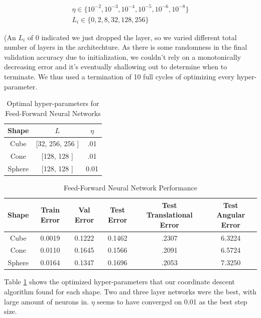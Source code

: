 \documentclass[journal]{IEEEtran}
\begin{document}
\begin{gather}
\eta \in \{  10^{-2}, 10^{-3}, 10^{-4}, 10^{-5}, 10^{-6}, 10^{-8} \}\\
L_i \in \{  0, 2, 8, 32, 128, 256  \}
\end{gather}

\noindent (An $L_i$ of 0 indicated we just dropped the layer, so we varied different total number of layers in the architechture. As there is some randomness in the final validation accuracy due to initialization, we couldn't rely on a monotonically decreasing error and it's eventually shallowing out to determine when to terminate. We thus used a termination of 10 full cycles of optimizing every hyper-parameter.

\begin{table}
\caption{Optimal hyper-parameters for Feed-Forward Neural Networks}
\label{FFNN_Params}
\centering

\begin{tabular}{|c|c|c|}
\hline
Shape & $L$ & $\eta$\\
\hline
Cube & [32, 256, 256 ] & .01\\
Cone & [128, 128 ] & .01\\
Sphere & [128, 128 ] & 0.01\\
\hline
\end{tabular}

\end{table}

\begin{table}
\caption{Feed-Forward Neural Network Performance}
\label{FFNN_Perf}
\centering

\begin{tabular}{|c|c|c|c|c|c|}
\hline
Shape & Train Error & Val Error & Test Error & Test Translational Error & Test Angular Error\\
\hline
Cube &0.0019    &0.1222   & 0.1462 & .2307 &  6.3224\\
Cone &0.0110   &0.1645    &0.1566 & .2091 & 6.5724\\
Sphere &0.0164    &0.1347   & 0.1696 & .2053 & 7.3250\\
\hline
\end{tabular}

\end{table}

Table \ref{FFNN_Params} shows the optimized hyper-parameters that our coordinate descent algorithm found for each shape. Two and three layer networks were the best, with large amount of neurons in. $\eta$ seems to have converged on 0.01 as the best step size.
\end{document}
